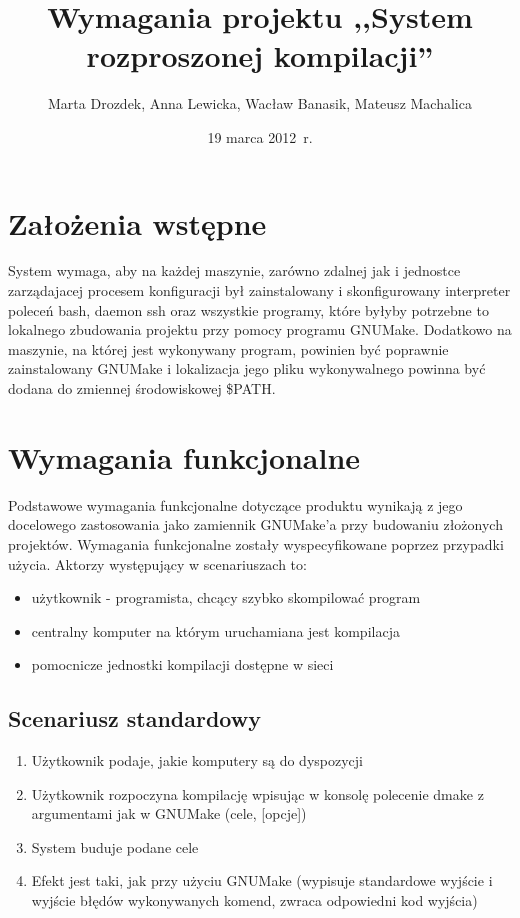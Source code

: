 \documentclass[a4paper]{article}
\title{Wymagania projektu ,,System rozproszonej kompilacji''}
\author{Marta Drozdek, Anna Lewicka, Wacław Banasik, Mateusz Machalica}
\date{19 marca 2012~r.}
\begin{document}
\maketitle

\section{Założenia wstępne}

System wymaga, aby na każdej maszynie, zarówno zdalnej jak i jednostce zarządajacej procesem konfiguracji był zainstalowany i skonfigurowany interpreter poleceń bash, daemon ssh oraz wszystkie programy, które byłyby potrzebne to lokalnego zbudowania projektu przy pomocy programu GNUMake. Dodatkowo na maszynie, na której jest wykonywany program, powinien być poprawnie zainstalowany GNUMake i lokalizacja jego pliku wykonywalnego powinna być dodana do zmiennej środowiskowej \$PATH.

\section{Wymagania funkcjonalne}

Podstawowe wymagania funkcjonalne dotyczące produktu wynikają z jego docelowego zastosowania jako zamiennik GNUMake’a przy budowaniu złożonych projektów. Wymagania funkcjonalne zostały wyspecyfikowane poprzez przypadki użycia. Aktorzy występujący w scenariuszach to:
\begin{itemize}
	\item użytkownik - programista, chcący szybko skompilować program
	\item centralny komputer na którym uruchamiana jest kompilacja
	\item pomocnicze jednostki kompilacji dostępne w sieci
\end{itemize}

\subsection{Scenariusz standardowy}

\begin{enumerate}
	\item Użytkownik podaje, jakie komputery są do dyspozycji
	\item Użytkownik rozpoczyna kompilację wpisując w konsolę polecenie dmake z argumentami jak w GNUMake (cele, [opcje]) 
	\item System buduje podane cele
	\item Efekt jest taki, jak przy użyciu GNUMake (wypisuje standardowe wyjście i wyjście błędów wykonywanych komend, zwraca odpowiedni kod wyjścia)
\end{enumerate}
\end{document}

